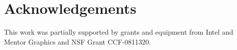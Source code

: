 \section{Acknowledgements}
This work was partially supported by grants and equipment from Intel and Mentor Graphics and NSF Grant CCF-0811320.
